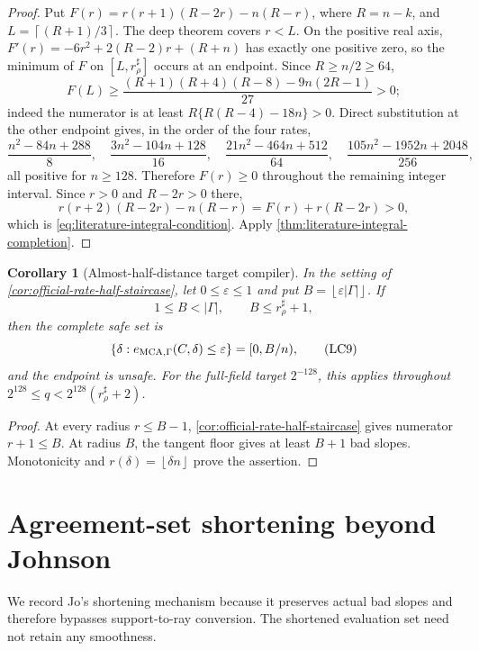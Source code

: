 \documentclass[11pt,a4paper]{amsart}
\numberwithin{equation}{section}
\newtheorem{corollary}[corollary]{Corollary}
\theoremstyle{remark}
\newcommand{\eps}{\varepsilon}
\newcommand{\abs}[1]{\lvert #1\rvert}
\newcommand{\floor}[1]{\left\lfloor #1\right\rfloor}
\newcommand{\ceil}[1]{\left\lceil #1\right\rceil}
\begin{document}
\begin{proof}
Put \(F(r)=r(r+1)(R-2r)-n(R-r)\), where \(R=n-k\), and
\(L=\ceil{(R+1)/3}\).  The deep theorem covers \(r<L\).  On the
positive real axis, \(F'(r)=-6r^2+2(R-2)r+(R+n)\) has exactly one
positive zero, so the minimum of \(F\) on \([L,r_\rho^\sharp]\) occurs
at an endpoint.  Since \(R\ge n/2\ge64\),
\[
 F(L)\ge
 \frac{(R+1)(R+4)(R-8)-9n(2R-1)}{27}>0;
\]
indeed the numerator is at least
\(R\{R(R-4)-18n\}>0\).  Direct substitution at the other endpoint gives,
in the order of the four rates,
\[
 \frac{n^2-84n+288}{8},\quad
 \frac{3n^2-104n+128}{16},\quad
 \frac{21n^2-464n+512}{64},\quad
 \frac{105n^2-1952n+2048}{256},
\]
all positive for \(n\ge128\).  Therefore \(F(r)\ge0\) throughout the
remaining integer interval.  Since \(r>0\) and \(R-2r>0\) there,
\[
 r(r+2)(R-2r)-n(R-r)=F(r)+r(R-2r)>0,
\]
which is \eqref{eq:literature-integral-condition}.  Apply
\cref{thm:literature-integral-completion}.
\end{proof}

\begin{corollary}[Almost-half-distance target compiler]
\label{cor:half-distance-window-compiler}
In the setting of \cref{cor:official-rate-half-staircase}, let
\(0\le\eps\le1\) and put
\(B=\floor{\eps\abs\Gamma}\).  If
\[
 1\le B<\abs\Gamma,\qquad B\le r_\rho^\sharp+1,
\]
then the complete safe set is
\[
 \{\delta:e_{\rm MCA,\Gamma}(C,\delta)\le\eps\}
       =[0,B/n),                                   \tag{LC9}
 \label{eq:half-distance-safe-set}
\]
and the endpoint is unsafe.  For the full-field target \(2^{-128}\),
this applies throughout
\(2^{128}\le q<2^{128}(r_\rho^\sharp+2)\).
\end{corollary}

\begin{proof}
At every radius \(r\le B-1\),
\cref{cor:official-rate-half-staircase} gives numerator
\(r+1\le B\).  At radius \(B\), the tangent floor gives at least
\(B+1\) bad slopes.  Monotonicity and
\(r(\delta)=\floor{\delta n}\) prove the assertion.
\end{proof}


\section{Agreement-set shortening beyond Johnson}
\label{sec:agreement-shortening}

We record Jo's shortening mechanism because it preserves actual bad slopes
and therefore bypasses support-to-ray conversion.  The shortened evaluation
set need not retain any smoothness.
\end{document}
